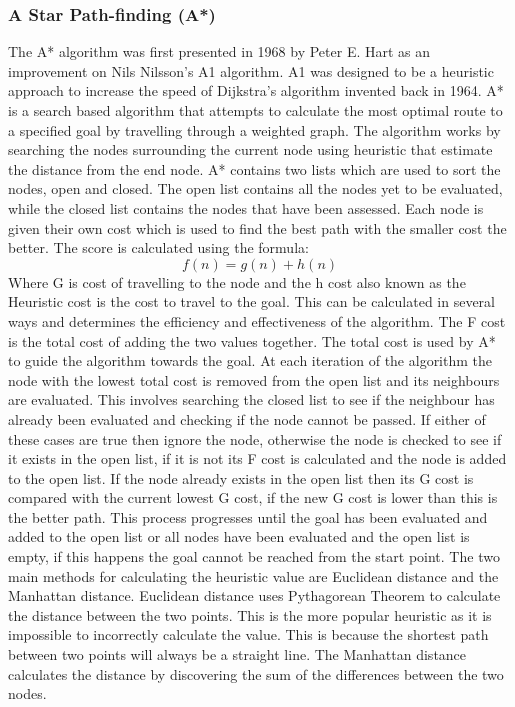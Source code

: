 \documentclass[12pt,a4paper,oneside]{book}
\begin{document}
\subsubsection{A Star Path-finding (A*)}
The A* algorithm was first presented in 1968 by Peter E. Hart as an improvement on Nils Nilsson’s A1 algorithm. A1 was designed to be a heuristic approach to increase the speed of Dijkstra’s algorithm invented back in 1964. A* is a search based algorithm that attempts to calculate the most optimal route to a specified goal by travelling through a weighted graph. 
\vspace{5mm} 
\newline
The algorithm works by searching the nodes surrounding the current node using heuristic that estimate the distance from the end node.  A* contains two lists which are used to sort the nodes, open and closed. The open list contains all the nodes yet to be evaluated, while the closed list contains the nodes that have been assessed. Each node is given their own cost which is used to find the best path with the smaller cost the better. The score is calculated using the formula:
\[f(n) = g(n) + h(n)\]  
Where G is cost of travelling to the node and the h cost also known as the Heuristic cost is the cost to travel to the goal. This can be calculated in several ways and determines the efficiency and effectiveness of the algorithm. The F cost is the total cost of adding the two values together.
\vspace{5mm} 
\newline
The total cost is used by A* to guide the algorithm towards the goal. At each iteration of the algorithm the node with the lowest total cost is removed from the open list and its neighbours are evaluated. This involves searching the closed list to see if the neighbour has already been evaluated and checking if the node cannot be passed. If either of these cases are true then ignore the node, otherwise the node is checked to see if it exists in the open list, if it is not its F cost is calculated and the node is added to the open list. If the node already exists in the open list then its G cost is compared with the current lowest G cost, if the new G cost is lower than this is the better path. This process progresses until the goal has been evaluated and added to the open list or all nodes have been evaluated and the open list is empty, if this happens the goal cannot be reached from the start point.
\vspace{5mm} 
\newline
The two main methods for calculating the heuristic value are Euclidean distance and the Manhattan distance. Euclidean distance uses  Pythagorean Theorem to calculate the distance between the two points. This is the more popular heuristic as it is impossible to incorrectly calculate the value. This is because the shortest path between two points will always be a straight line. The Manhattan distance calculates the distance by discovering the sum of the differences between the two nodes.
\vspace{5mm} 
\newline
\end{document}
